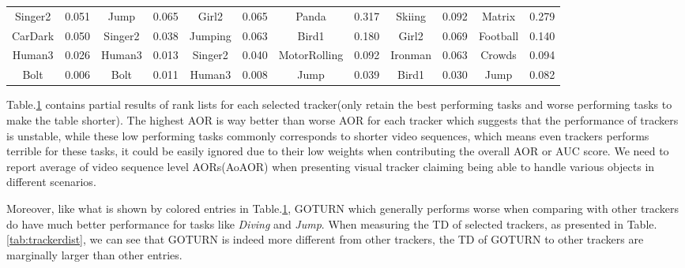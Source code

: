 \documentclass{article}
\begin{document}
\begin{table} [htbp]
{\begin{tabular}{cccccccccccc}
Singer2&0.051&\textcolor[rgb]{1,0,0}{Jump}&0.065&Girl2&0.065&Panda&0.317&Skiing&0.092&Matrix&0.279\\
CarDark&0.050&Singer2&0.038&Jumping&0.063&Bird1&0.180&Girl2&0.069&Football&0.140\\
Human3&0.026&Human3&0.013&Singer2&0.040&MotorRolling&0.092&Ironman&0.063&Crowds&0.094\\
Bolt&0.006&Bolt&0.011&Human3&0.008&\textcolor[rgb]{1,0,0}{Jump}&0.039&Bird1&0.030&\textcolor[rgb]{1,0,0}{Jump}&0.082\\
    \bottomrule
    \end{tabular}%
    }
  \label{tab:avgoverlapvalues}%
\end{table}%

Table.\ref{tab:avgoverlapvalues} contains partial results of rank lists for each selected tracker(only retain the best performing tasks and worse performing tasks to make the table shorter). The highest AOR is way better than worse AOR for each tracker which suggests that the performance of trackers is unstable, while these low performing tasks commonly corresponds to shorter video sequences, which means even trackers performs terrible for these tasks, it could be easily ignored due to their low weights when contributing the overall AOR or AUC score. We need to report average of video sequence level AORs(AoAOR) when presenting visual tracker claiming being able to handle various objects in different scenarios.

Moreover, like what is shown by colored entries in Table.\ref{tab:avgoverlapvalues}, GOTURN\cite{goturn} which generally performs worse when comparing with other trackers do have much better performance for tasks like \emph{Diving} and \emph{Jump}. When measuring the TD of selected trackers, as presented in Table.\ref{tab:trackerdist}, we can see that GOTURN\cite{goturn} is indeed more different from other trackers, the TD of GOTURN\cite{goturn} to other trackers are marginally larger than other entries.
\end{document}
